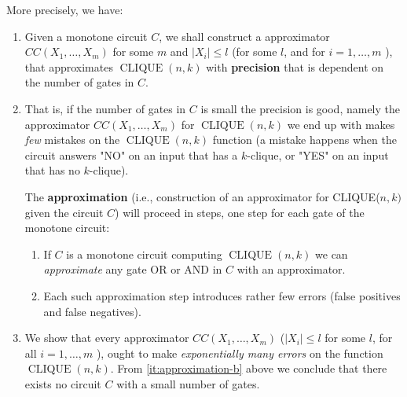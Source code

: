 More precisely, we have:  
\begin{enumerate}
 
\item  Given a monotone circuit $C$, we shall construct a approximator 
$CC(X_1, \ldots, X_m)$ for some $m$ and $|{X}_{i}| \leq l$ (for some $l$, and for $i=1, \ldots, m$ ), that approximates $\operatorname{CLIQUE}({n}, {k})$ with \textbf{precision} that is dependent on the number of gates in $C$.

\item That is, if the number of gates in $C$ is small the precision is  good, namely the approximator ${CC}(X_1, \ldots, X_m)$ for $\operatorname{CLIQUE}({n}, {k})$ we end up with makes \textit{few} mistakes on the $\operatorname{CLIQUE}({n}, {k})$ function (a mistake happens when the circuit  answers  "NO" on an input that has a $k$-clique, or "YES" on an input that has no $k$-clique).\label{it:approximation-b}

The \textbf{approximation} (i.e., construction of an approximator for CLIQUE(${n},{k})$ given the circuit $C$) will proceed in steps, one step for each gate of the monotone circuit:

\begin{enumerate}
    
\item If $C$ is a monotone circuit computing $\operatorname{CLIQUE}({n}, {k})$ we can \textit{approximate} any gate OR or AND in $C$ with an approximator.

\item Each such approximation step introduces rather few errors (false positives and false negatives).
\end{enumerate}



\item We show that every approximator ${CC}({X}_1, \ldots, {X_m})$ ($|{X}_i| \leq l$ for some $l$, for all $i=1, \ldots, m$ ), ought to make \textit{exponentially many errors} on the function $\operatorname{CLIQUE}(n, k)$. From \ref{it:approximation-b} above we conclude that there exists no circuit $C$ with a small number of gates. 
\end{enumerate}





